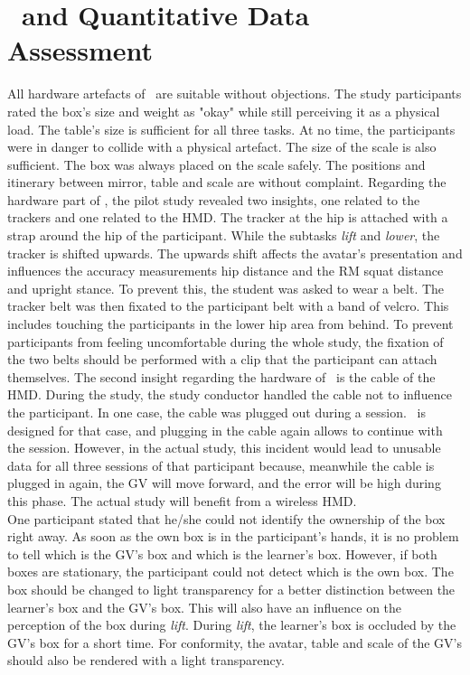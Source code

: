 \section{\exgo\ and Quantitative Data Assessment}
\label{sec:evalSystem}
All hardware artefacts of \exgo\ are suitable without objections. The study participants rated the box's size and weight as "okay" while still perceiving it as a physical load. The table's size is sufficient for all three tasks. At no time, the participants were in danger to collide with a physical artefact. The size of the scale is also sufficient. The box was always placed on the scale safely. The positions and itinerary between mirror, table and scale are without complaint. Regarding the hardware part of \exgo, the pilot study revealed two insights, one related to the trackers and one related to the HMD. The tracker at the hip is attached with a strap around the hip of the participant. While the subtasks \textit{lift} and \textit{lower}, the tracker is shifted upwards. The upwards shift affects the avatar's presentation and influences the accuracy measurements hip distance and the RM squat distance and upright stance. To prevent this, the student was asked to wear a belt. The tracker belt was then fixated to the participant belt with a band of velcro. This includes touching the participants in the lower hip area from behind. To prevent participants from feeling uncomfortable during the whole study, the fixation of the two belts should be performed with a clip that the participant can attach themselves. The second insight regarding the hardware of \exgo\ is the cable of the HMD. During the study, the study conductor handled the cable not to influence the participant. In one case, the cable was plugged out during a session. \exgo\ is designed for that case, and plugging in the cable again allows to continue with the session. However, in the actual study, this incident would lead to unusable data for all three sessions of that participant because, meanwhile the cable is plugged in again, the GV will move forward, and the error will be high during this phase. The actual study will benefit from a wireless HMD.\\
One participant stated that he/she could not identify the ownership of the box right away. As soon as the own box is in the participant's hands, it is no problem to tell which is the GV's box and which is the learner's box. However, if both boxes are stationary, the participant could not detect which is the own box. The box should be changed to light transparency for a better distinction between the learner's box and the GV's box. This will also have an influence on the perception of the box during \textit{lift}. During \textit{lift}, the learner's box is occluded by the GV's box for a short time. For conformity, the avatar, table and scale of the GV's should also be rendered with a light transparency.\\
